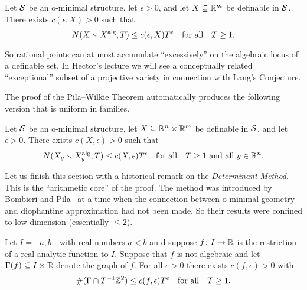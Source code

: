 \begin{theorem}
  \label{thm:pilawilkie}
  Let ${\mathcal S}$ be an o-minimal structure,
  let $\epsilon>0$, and let $X\subseteq{\mathbb{R}}^m$ be
  definable in ${\mathcal S}$.
  There exists  $c(\epsilon,X)>0$ such that
  \begin{equation*}
    N(X\smallsetminus X^{\mathrm{alg}},T)\le c(\epsilon,X) T^\epsilon \quad\text{for
      all}\quad T\ge 1.
  \end{equation*}
\end{theorem}

So rational points can at most accumulate ``excessively'' on the
algebraic locus of a definable set. In Hector's lecture we will see a
conceptually related ``exceptional'' subset of a projective variety in
connection with Lang's Conjecture.

The proof of the Pila--Wilkie Theorem automatically produces the
following version that is uniform in families.

\begin{theorem}
  Let ${\mathcal S}$ be an o-minimal structure,  let $X\subseteq{\mathbb{R}}^n\times {\mathbb{R}}^m$ be
  definable in ${\mathcal S}$, and let $\epsilon >0$.
  There exists  $c(X,\epsilon)>0$ such that
  \begin{equation*}
    N(X_y\smallsetminus X_y^{\mathrm{alg}},T)\le c(X,\epsilon) T^\epsilon \quad\text{for
      all}\quad T\ge 1\text{ and all }y\in{\mathbb{R}}^n. 
  \end{equation*}
\end{theorem}

Let us finish this section with a historical remark on the
\textit{Determinant Method}. This is the ``arithmetic core'' of the
proof. The method was introduced by Bombieri and
Pila~\cite{BombieriPila} at a time when the connection between
o-minimal geometry and diophantine approximation had not been made.
So their results were confined to low dimension (essentially $\le 2$).

\begin{theorem}
  Let $I = [a,b]$ with real numbers $a<b$ an d suppose $f\colon
  I\rightarrow {\mathbb{R}}$ is the restriction of a real analytic function to
  $I$. Suppose that $f$ is not algebraic and let $\Gamma(f)\subseteq
  I\times {\mathbb{R}}$ denote the graph of $f$. For all $\epsilon > 0$ there
  exists $c(f,\epsilon)> 0$ with
  \begin{equation*}
    \# (\Gamma \cap T^{-1}{\mathbb{Z}}^2) \le c(f,\epsilon)T^\epsilon
    \quad\text{for all}\quad T\ge 1. 
  \end{equation*}
\end{theorem}

